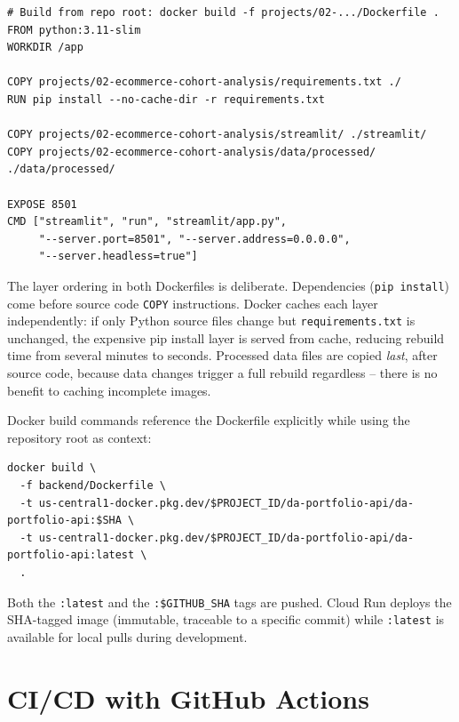 \begin{lstlisting}[style=dockerfile, caption={Streamlit Dockerfile -- projects/02-ecommerce-cohort-analysis/Dockerfile}]
# Build from repo root: docker build -f projects/02-.../Dockerfile .
FROM python:3.11-slim
WORKDIR /app

COPY projects/02-ecommerce-cohort-analysis/requirements.txt ./
RUN pip install --no-cache-dir -r requirements.txt

COPY projects/02-ecommerce-cohort-analysis/streamlit/ ./streamlit/
COPY projects/02-ecommerce-cohort-analysis/data/processed/ ./data/processed/

EXPOSE 8501
CMD ["streamlit", "run", "streamlit/app.py",
     "--server.port=8501", "--server.address=0.0.0.0",
     "--server.headless=true"]
\end{lstlisting}

\begin{keyinsight}
The layer ordering in both Dockerfiles is deliberate. Dependencies (\texttt{pip install}) come before source code \texttt{COPY} instructions. Docker caches each layer independently: if only Python source files change but \texttt{requirements.txt} is unchanged, the expensive pip install layer is served from cache, reducing rebuild time from several minutes to seconds. Processed data files are copied \emph{last}, after source code, because data changes trigger a full rebuild regardless -- there is no benefit to caching incomplete images.
\end{keyinsight}

Docker build commands reference the Dockerfile explicitly while using the repository root as context:

\begin{lstlisting}[style=yaml, caption={Build invocation pattern (from CI workflow)}]
docker build \
  -f backend/Dockerfile \
  -t us-central1-docker.pkg.dev/$PROJECT_ID/da-portfolio-api/da-portfolio-api:$SHA \
  -t us-central1-docker.pkg.dev/$PROJECT_ID/da-portfolio-api/da-portfolio-api:latest \
  .
\end{lstlisting}

Both the \texttt{:latest} and the \texttt{:\$GITHUB\_SHA} tags are pushed. Cloud Run deploys the SHA-tagged image (immutable, traceable to a specific commit) while \texttt{:latest} is available for local pulls during development.

\section{CI/CD with GitHub Actions}
\label{sec:infra-cicd}


